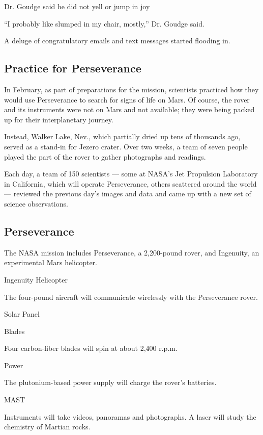 Dr. Goudge said he did not yell or jump in joy

``I probably like slumped in my chair, mostly,'' Dr. Goudge said.

A deluge of congratulatory emails and text messages started flooding in.

\hypertarget{practice-for-perseverance}{%
\subsection{Practice for Perseverance}\label{practice-for-perseverance}}

In February, as part of preparations for the mission, scientists
practiced how they would use Perseverance to search for signs of life on
Mars. Of course, the rover and its instruments were not on Mars and not
available; they were being packed up for their interplanetary journey.

Instead, Walker Lake, Nev., which partially dried up tens of thousands
ago, served as a stand-in for Jezero crater. Over two weeks, a team of
seven people played the part of the rover to gather photographs and
readings.

Each day, a team of 150 scientists --- some at NASA's Jet Propulsion
Laboratory in California, which will operate Perseverance, others
scattered around the world --- reviewed the previous day's images and
data and came up with a new set of science observations.

\hypertarget{perseverance}{%
\subsection{Perseverance}\label{perseverance}}

The NASA mission includes Perseverance, a 2,200-pound rover, and
Ingenuity, an experimental Mars helicopter.

Ingenuity Helicopter

The four-pound aircraft will communicate wirelessly with the
Perseverance rover.

Solar Panel

Blades

Four carbon-fiber blades will spin at about 2,400 r.p.m.

Power

The plutonium-based power supply will charge the rover's batteries.

MAST

Instruments will take videos, panoramas and photographs. A laser will
study the chemistry of Martian rocks.

